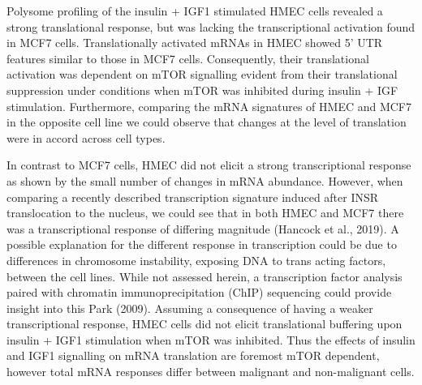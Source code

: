 \documentclass[
  12pt,
  openany]{book}
\begin{document}
Polysome profiling of the insulin + IGF1 stimulated HMEC cells revealed a strong translational response, but was lacking the transcriptional activation found in MCF7 cells. Translationally activated mRNAs in HMEC showed 5' UTR features similar to those in MCF7 cells. Consequently, their translational activation was dependent on mTOR signalling evident from their translational suppression under conditions when mTOR was inhibited during insulin + IGF stimulation. Furthermore, comparing the mRNA signatures of HMEC and MCF7 in the opposite cell line we could observe that changes at the level of translation were in accord across cell types.

In contrast to MCF7 cells, HMEC did not elicit a strong transcriptional response as shown by the small number of changes in mRNA abundance. However, when comparing a recently described transcription signature induced after INSR translocation to the nucleus, we could see that in both HMEC and MCF7 there was a transcriptional response of differing magnitude (Hancock et al., 2019). A possible explanation for the different response in transcription could be due to differences in chromosome instability, exposing DNA to trans acting factors, between the cell lines. While not assessed herein, a transcription factor analysis paired with chromatin immunoprecipitation (ChIP) sequencing could provide insight into this Park (2009). Assuming a consequence of having a weaker transcriptional response, HMEC cells did not elicit translational buffering upon insulin + IGF1 stimulation when mTOR was inhibited. Thus the effects of insulin and IGF1 signalling on mRNA translation are foremost mTOR dependent, however total mRNA responses differ between malignant and non-malignant cells.
\end{document}
